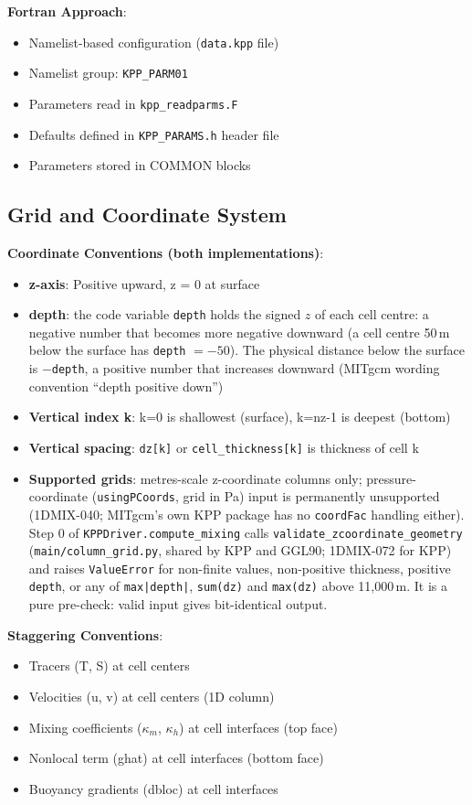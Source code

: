 \documentclass[11pt]{article}
\begin{document}
\textbf{Fortran Approach}:
\begin{itemize}
    \item Namelist-based configuration (\verb|data.kpp| file)
    \item Namelist group: \verb|KPP_PARM01|
    \item Parameters read in \verb|kpp_readparms.F|
    \item Defaults defined in \verb|KPP_PARAMS.h| header file
    \item Parameters stored in COMMON blocks
\end{itemize}

\subsection{Grid and Coordinate System}

\textbf{Coordinate Conventions (both implementations)}:
\begin{itemize}
    \item \textbf{z-axis}: Positive upward, z = 0 at surface
    \item \textbf{depth}: the code variable \verb|depth| holds the signed $z$ of each cell centre: a negative number that becomes more negative downward (a cell centre 50\,m below the surface has \verb|depth| $= -50$). The physical distance below the surface is $-$\verb|depth|, a positive number that increases downward (MITgcm wording convention ``depth positive down'')
    \item \textbf{Vertical index k}: k=0 is shallowest (surface), k=nz-1 is deepest (bottom)
    \item \textbf{Vertical spacing}: \verb|dz[k]| or \verb|cell_thickness[k]| is thickness of cell k
    \item \textbf{Supported grids}: metres-scale z-coordinate columns only; pressure-coordinate (\verb|usingPCoords|, grid in Pa) input is permanently unsupported (1DMIX-040; MITgcm's own KPP package has no \verb|coordFac| handling either). Step 0 of \verb|KPPDriver.compute_mixing| calls \verb|validate_zcoordinate_geometry| (\verb|main/column_grid.py|, shared by KPP and GGL90; 1DMIX-072 for KPP) and raises \verb|ValueError| for non-finite values, non-positive thickness, positive \verb|depth|, or any of \verb+max|depth|+, \verb+sum(dz)+ and \verb+max(dz)+ above 11,000\,m. It is a pure pre-check: valid input gives bit-identical output.
\end{itemize}

\textbf{Staggering Conventions}:
\begin{itemize}
    \item Tracers (T, S) at cell centers
    \item Velocities (u, v) at cell centers (1D column)
    \item Mixing coefficients ($\kappa_m$, $\kappa_h$) at cell interfaces (top face)
    \item Nonlocal term (ghat) at cell interfaces (bottom face)
    \item Buoyancy gradients (dbloc) at cell interfaces
\end{itemize}
\end{document}
